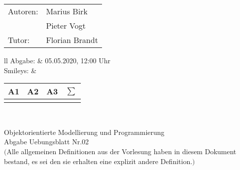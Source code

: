 \documentclass[12pt,a4paper,oneside,ngerman]{article}
\newcommand{\fach}{Objektorientierte Modellierung und Programmierung}
\newcommand{\dokumentenTitel}{Abgabe Uebungsblatt Nr.02}
\newcommand{\Abgabe}{05.05.2020, 12:00 Uhr}
\newcommand{\memberOne}{Marius Birk}
\newcommand{\memberTwo}{Pieter Vogt}
\newcommand{\tutor}{ Florian Brandt }
\begin{document}
	\thispagestyle{plain} %
	
	\begin{multicols}{2} %
		\hspace{-1cm} %
		\begin{tabular}{ll} %
			Autoren: & \memberOne \\ %
			& \memberTwo \\
			Tutor: & \tutor \\  
		\end{tabular}
		
		\columnbreak %
		\hspace{-1cm} %
		\begin{tabular}{ll} %
			Abgabe: & \Abgabe \\ %
			Smileys: &  
			\renewcommand{\arraystretch}{1.2} 
			\begin{tabular}{|p{0.8cm}|p{0.8cm}|p{0.8cm}|p{0.8cm}|}
				\hline A1 & A2 & A3 & $\sum\limits^{ }$ \\ \hline
				& & & \\ \hline    
			\end{tabular} \\
		\end{tabular}
		
	\end{multicols} %
	
	\begin{center}
		\Large{\fach} \\
		\LARGE{\dokumentenTitel} \\
		\small
		$($Alle allgemeinen Definitionen aus der Vorlesung haben in diesem Dokument bestand, es sei den sie erhalten eine explizit andere Definition.$)$
    \end{center}
\end{document}
